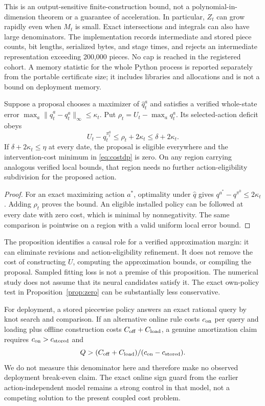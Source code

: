 This is an output-sensitive finite-construction bound, not a polynomial-in-dimension theorem or a guarantee of acceleration. In particular, $Z_t$ can grow rapidly even when $M_t$ is small. Exact intersections and integrals can also have large denominators. The implementation records intermediate and stored piece counts, bit lengths, serialized bytes, and stage times, and rejects an intermediate representation exceeding 200,000 pieces. No cap is reached in the registered cohort. A memory statistic for the whole Python process is reported separately from the portable certificate size; it includes libraries and allocations and is not a bound on deployment memory.

\begin{proposition}\label{prop:proposal}
Suppose a proposal chooses a maximizer of $\widehat q_t^a$ and satisfies a verified whole-state error $\max_a\|\widehat q_t^a-q_t^a\|_\infty\le\kappa_t$. Put $\rho_t=U_t-\max_aq_t^a$. Its selected-action deficit obeys
\begin{equation}
 U_t-q_t^{\pi_t^0}\le\rho_t+2\kappa_t\le\delta+2\kappa_t.
\end{equation}
If $\delta+2\kappa_t\le\eta$ at every date, the proposal is eligible everywhere and the intervention-cost minimum in \eqref{eq:costdp} is zero. On any region carrying analogous verified local bounds, that region needs no further action-eligibility subdivision for the proposed action.
\end{proposition}
\begin{proof}
For an exact maximizing action $a^*$, optimality under $\widehat q$ gives $q^{a^*}-q^{\pi^0}\le2\kappa_t$. Adding $\rho_t$ proves the bound. An eligible installed policy can be followed at every date with zero cost, which is minimal by nonnegativity. The same comparison is pointwise on a region with a valid uniform local error bound.\end{proof}

The proposition identifies a causal role for a verified approximation margin: it can eliminate revisions and action-eligibility refinement. It does not remove the cost of constructing $U$, computing the approximation bounds, or compiling the proposal. Sampled fitting loss is not a premise of this proposition. The numerical study does not assume that its neural candidates satisfy it. The exact own-policy test in Proposition~\ref{prop:zero} can be substantially less conservative.

For deployment, a stored piecewise policy answers an exact rational query by knot search and comparison. If an alternative online rule costs $c_{\rm on}$ per query and loading plus offline construction costs $C_{\rm off}+C_{\rm load}$, a genuine amortization claim requires $c_{\rm on}>c_{\rm stored}$ and
\begin{equation}
 Q>(C_{\rm off}+C_{\rm load})/(c_{\rm on}-c_{\rm stored}).
\end{equation}
We do not measure this denominator here and therefore make no observed deployment break-even claim. The exact online sign guard from the earlier action-independent model remains a strong control in that model, not a competing solution to the present coupled cost problem.

